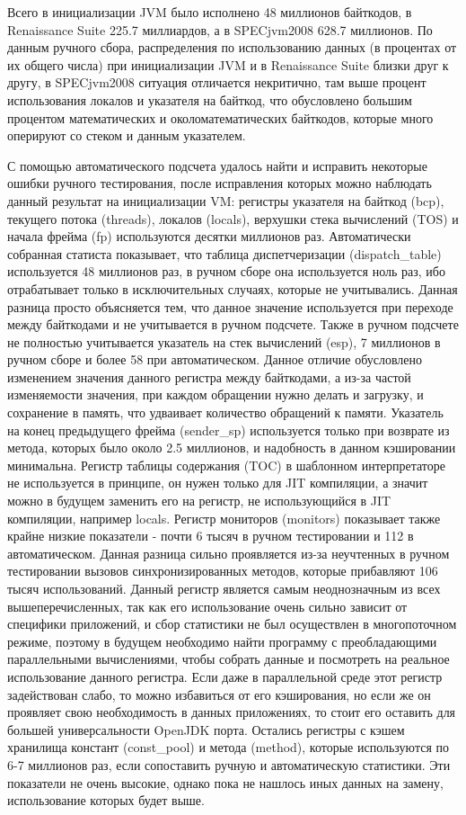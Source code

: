 Всего в инициализации JVM было исполнено 48 миллионов байткодов, в Renaissance Suite 225.7 миллиардов, а в SPECjvm2008 628.7 миллионов. По данным ручного сбора, распределения по использованию данных (в процентах от их общего числа) при инициализации JVM и в Renaissance Suite близки друг к другу, в SPECjvm2008 ситуация отличается некритично, там выше процент использования локалов и указателя на байткод, что обусловлено большим процентом математических и околоматематических байткодов, которые много оперируют со стеком и данным указателем.

С помощью автоматического подсчета удалось найти и исправить некоторые ошибки ручного тестирования, после исправления которых можно наблюдать данный результат на инициализации VM: регистры указателя на байткод (bcp), текущего потока (threads), локалов (locals), верхушки стека вычислений (TOS) и начала фрейма (fp) используются десятки миллионов раз. Автоматически собранная статиста показывает, что таблица диспетчеризации (dispatch\_table) используется 48 миллионов раз, в ручном сборе она используется ноль раз, ибо отрабатывает только в исключительных случаях, которые не учитывались. Данная разница просто объясняется тем, что данное значение используется при переходе между байткодами и не учитывается в ручном подсчете. Также в ручном подсчете не полностью учитывается указатель на стек вычислений (esp), 7 миллионов в ручном сборе и более 58 при автоматическом. Данное отличие обусловлено изменением значения данного регистра между байткодами, а из-за частой изменяемости значения, при каждом обращении нужно делать и загрузку, и сохранение в память, что удваивает количество обращений к памяти. Указатель на конец предыдущего фрейма (sender\_sp) используется только при возврате из метода, которых было около 2.5 миллионов, и надобность в данном кэшировании минимальна. Регистр таблицы содержания (TOC) в шаблонном интерпретаторе не используется в принципе, он нужен только для JIT компиляции, а значит можно в будущем заменить его на регистр, не использующийся в JIT компиляции, например locals. Регистр мониторов (monitors) показывает также крайне низкие показатели - почти 6 тысяч в ручном тестировании и 112 в автоматическом. Данная разница сильно проявляется из-за неучтенных в ручном тестировании вызовов синхронизированных методов, которые прибавляют 106 тысяч использований. Данный регистр является самым неоднозначным из всех вышеперечисленных, так как его использование очень сильно зависит от специфики приложений, и сбор статистики не был осуществлен в многопоточном режиме, поэтому в будущем необходимо найти программу с преобладающими параллельными вычислениями, чтобы собрать данные и посмотреть на реальное использование данного регистра. Если даже в параллельной среде этот регистр задействован слабо, то можно избавиться от его кэширования, но если же он проявляет свою необходимость в данных приложениях, то стоит его оставить для большей универсальности OpenJDK порта. Остались регистры с кэшем хранилища констант (const\_pool) и метода (method), которые используются по 6-7 миллионов раз, если сопоставить ручную и автоматическую статистики. Эти показатели не очень высокие, однако пока не нашлось иных данных на замену, использование которых будет выше.

